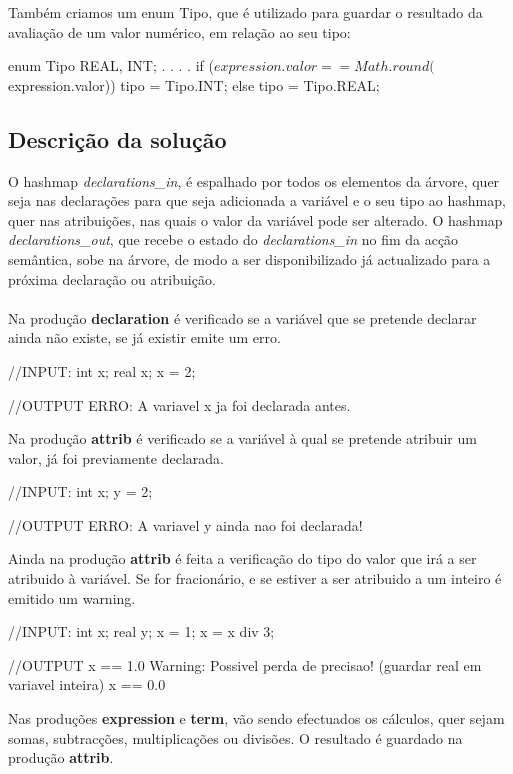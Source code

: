 \documentclass[11pt,a4paper]{article}
\begin{document}
Também criamos um enum Tipo, que é utilizado para guardar o resultado da avaliação de um valor numérico, em relação ao seu tipo: 
\begin{code_txt}
enum Tipo {REAL, INT};
.
.
.
.
if ($expression.valor == Math.round($expression.valor)) {
	tipo = Tipo.INT;
} else {
	tipo = Tipo.REAL;
	}
\end{code_txt}



\subsection{Descrição da solução}
O hashmap \textit{declarations\_in}, é espalhado por todos os elementos da árvore, quer seja nas declarações para que seja adicionada 
a variável e o seu tipo ao hashmap, quer nas atribuições, nas quais o valor da variável pode ser alterado.
O hashmap \textit{declarations\_out}, que recebe o estado do \textit{declarations\_in} no fim da acção semântica, sobe na árvore, de modo
a ser disponibilizado já actualizado para a próxima declaração ou atribuição.\\
\\
Na produção \textbf{declaration} é verificado se a variável que se pretende declarar ainda não existe, se já existir emite um erro.


\begin{code_txt}
//INPUT:
int x;
real x;
x  = 2;

//OUTPUT
ERRO: A variavel x ja foi declarada antes.
\end{code_txt}


Na produção \textbf{attrib} é verificado se a variável à qual se pretende atribuir um valor, já foi previamente declarada.
\begin{code_txt}
//INPUT:
int x;
y  = 2;


//OUTPUT
ERRO: A variavel y ainda nao foi declarada!
\end{code_txt}

Ainda na produção \textbf{attrib} é feita a verificação do tipo do valor que irá a ser atribuido à variável. Se for fracionário, e se estiver a ser atribuido a um inteiro é emitido um warning.
\begin{code_txt}
//INPUT:
int x;
real y;
x = 1;
x = x div 3;


//OUTPUT
x == 1.0
Warning: Possivel perda de precisao! (guardar real em variavel inteira)
x == 0.0
\end{code_txt}

Nas produções \textbf{expression} e \textbf{term}, vão sendo efectuados os cálculos, quer sejam somas, subtracções, multiplicações ou divisões. O resultado é guardado na produção \textbf{attrib}.
\end{document}
